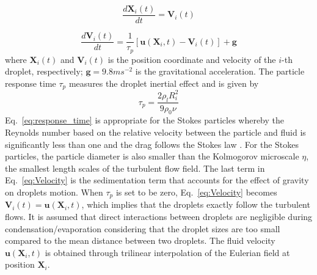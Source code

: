 \documentclass[draft,linenumbers]{agujournal}
\newcommand{\Eq}[1]{Eq.~\eqref{#1}}
\begin{document}
\begin{equation}
\frac{d\mathbf{X}_i(t)}{dt}=\mathbf{V}_i(t)\label{eq:Coords}
\end{equation}


\begin{equation}
\frac{d\mathbf{V}_i(t)}{dt}=\frac{1}{\tau_{p}}[\mathbf{u}(\mathbf{X}_i,t)-\mathbf{V}_i(t)]+\mathbf{g}\label{eq:Velocity}
\end{equation}
where {$\mathbf{X}_i(t)$ and $\mathbf{V}_i(t)$ is the position coordinate and velocity of the $i$-th droplet, respectively; $\mathbf{g} = 9.8 m s^{-2}$ is the gravitational acceleration.} The particle response time $\tau_p$ measures the droplet inertial effect and is given by
\begin{equation}
\tau_{p}=\frac{2\rho_{l}R_i^{2}}{9\rho_{0}\nu}
\label{eq:response_time}
\end{equation}
\Eq{eq:response_time} is appropriate for the Stokes particles whereby the Reynolds number 
based on the relative velocity between the particle and fluid is significantly less than one and the 
drag follows the Stokes law \citep{Eaton94}. For the Stokes particles, the particle diameter is also smaller than the Kolmogorov microscale $\eta$, the smallest length scales of the turbulent flow field.
The last term in \Eq{eq:Velocity} is the sedimentation term that accounts for the effect of 
gravity on droplets motion. When $\tau_{p}$ is set to be zero, \Eq{eq:Velocity} becomes $\mathbf{V}_i(t)=\mathbf{u}(\mathbf{X}_i,t)$, 
which implies that the droplets exactly follow the turbulent flows. 
It is assumed that direct interactions between droplets are negligible during 
condensation/evaporation considering that the droplet sizes are too small compared to the mean distance between two droplets. The fluid velocity $\mathbf{u}(\mathbf{X}_i, t)$ 
is obtained through {trilinear} interpolation of the Eulerian field at position $\mathbf{X}_i$.
\end{document}
